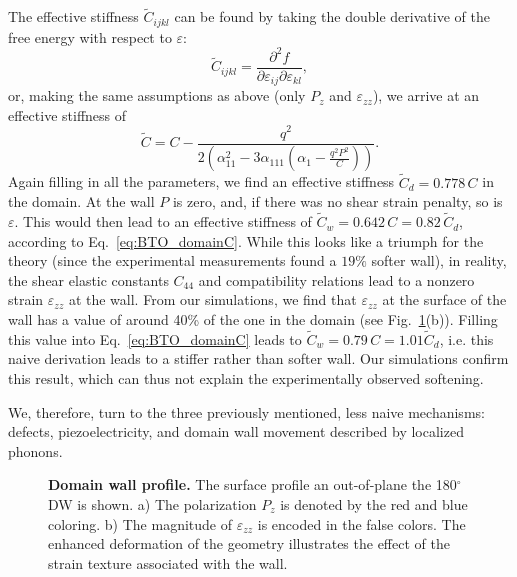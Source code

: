 The effective stiffness $\tilde{C}_{ijkl}$ can be found by taking the double derivative of the free energy with respect to $\varepsilon$:
\begin{equation}
	\tilde{C}_{ijkl} = \frac{\partial^2 f}{\partial \varepsilon_{ij} \partial \varepsilon_{kl}},
\end{equation}
or, making the same assumptions as above (only $P_z$ and $\varepsilon_{zz}$), we arrive at an effective stiffness of
\begin{equation}
	\label{eq:BTO_domainC}
	\tilde{C} = C - \frac{q^2}{2\left(\alpha_{11}^2 - 3 \alpha_{111}\left(\alpha_1  - \frac{q^2 P^2}{C}\right)\right)}.
\end{equation}
Again filling in all the parameters, we find an effective stiffness $\tilde{C}_d = 0.778 \,C$ in the domain.
At the wall $P$ is zero, and, if there was no shear strain penalty, so is $\varepsilon$. This would then lead to an effective stiffness of $\tilde{C}_w = 0.642 \, C = 0.82\, \tilde{C}_d$, according to Eq.~\eqref{eq:BTO_domainC}.
While this looks like a triumph for the theory (since the experimental measurements found a $19\%$ softer wall), in reality, the shear elastic constants $C_{44}$ and compatibility relations lead to a nonzero strain $\varepsilon_{zz}$ at the wall.
From our simulations, we find that $\varepsilon_{zz}$ at the surface of the wall has a value of around 40\% of the one in the domain (see Fig.~\ref{fig:BTO_wall}(b)).
Filling this value into Eq.~\eqref{eq:BTO_domainC} leads to $\tilde{C}_w = 0.79 \, C = 1.01 \tilde{C}_d$, i.e. this naive derivation leads to a stiffer rather than softer wall.
Our simulations confirm this result, which can thus not explain the experimentally observed softening.

We, therefore, turn to the three previously mentioned, less naive mechanisms: defects, piezoelectricity, and domain wall movement described by localized phonons.

\begin{figure}[h]
	\caption{\label{fig:BTO_wall} {\bf Domain wall profile.} The surface profile an out-of-plane the 180$^\circ$ \gls{DW} is shown. a) The polarization $P_z$ is denoted by the red and blue coloring. b) The magnitude of $\varepsilon_{zz}$ is encoded in the false colors. The enhanced deformation of the geometry illustrates the effect of the strain texture associated with the wall.}
\end{figure}

